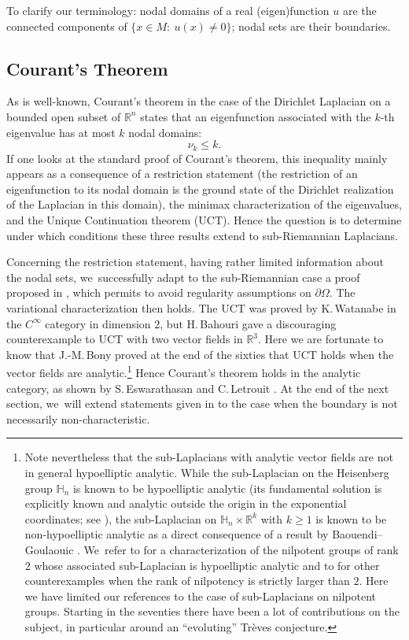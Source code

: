 \documentclass[10pt]{amsart}
\theoremstyle{definition}
\newcommand{\1}{\mathbbm{1}}
\begin{document}
To clarify our terminology: nodal domains of a real (eigen)function $u$ are the connected components of $\{ x\in M:\ u(x) \neq 0\}$; nodal sets are their boundaries.

\subsection{Courant's Theorem}
As is well-known, Courant's theorem in the case of the Dirichlet Laplacian on a bounded open subset of $\mathbb R^n$ states that an eigenfunction associated with the $k$-th eigenvalue has at most $k$ nodal domains:
\[
\nu_k \leq k.
\]
If one looks at the standard proof of Courant's theorem, this inequality mainly appears as a consequence of a restriction statement (the restriction of an eigenfunction to its nodal domain is the ground state of the Dirichlet realization of the Laplacian in this domain), the minimax characterization of the eigenvalues, and the Unique Continuation theorem (UCT). Hence the question is to determine under which conditions these three results extend to sub-Riemannian Laplacians.

Concerning the restriction statement, having rather limited information about the nodal sets, we~successfully adapt to the sub-Riemannian case a proof proposed in \cite{MP}, which permits to avoid regularity assumptions on $\partial \Omega$. The variational characterization then holds. The UCT was proved by K.\,Watanabe \cite{Wa} in the $C^\infty$ category in dimension 2, but H.\,Bahouri \cite{Ba, Ba2} gave a discouraging counterexample to UCT with two vector fields in $ \mathbb R^3$.
Here
we are fortunate to know that J.-M.\,Bony proved at the end of the sixties \cite{Bo} that UCT holds when the vector fields are analytic.\footnote{Note nevertheless that the sub-Laplacians with analytic vector fields are not in general hypoelliptic analytic. While the sub-Laplacian on the Heisenberg group $\mathbb H_n$ is known to be hypoelliptic analytic (its fundamental solution is explicitly known and analytic outside the origin
in the exponential coordinates; see \cite{Fo0}), the sub-Laplacian on $\mathbb H_n\times \mathbb R^k$ with $k\geq 1$ is known to be non-hypoelliptic analytic as a direct consequence of a result by Baouendi--Goulaouic \cite{BaGo}. We~refer to \cite{Me2} for a characterization of the nilpotent groups of rank $2$ whose associated sub-Laplacian is hypoelliptic analytic and to \cite{Hel} for other counterexamples when the rank of nilpotency is strictly larger than $2$. Here we have limited our references to the case of sub-Laplacians on nilpotent groups. Starting in the seventies there have been a lot of contributions on the subject, in particular around an ``evoluting'' Trèves conjecture.}
Hence Courant's theorem holds in the analytic category, as shown by S.\,Eswarathasan and C.\,Letrouit \cite{EL}. At the end of the next section, we~will extend statements given in \cite{EL} to the case when the boundary is not necessarily non-characteristic.
\end{document}
